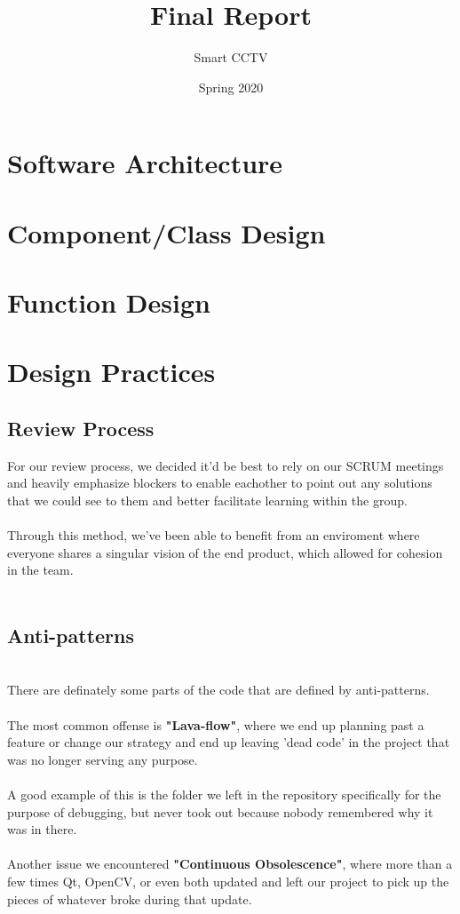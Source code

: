 \documentclass[12pt]{article}
\title{Final Report}
\author{Smart CCTV}
\date{Spring 2020}
\begin{document}
\maketitle
\pagebreak

\section*{Software Architecture}
\pagebreak

\section*{Component/Class Design}

\pagebreak

\section*{Function Design}
\pagebreak

\section*{Design Practices}
\subsection*{Review Process}
For our review process, we decided it'd be best to rely on our SCRUM meetings and heavily emphasize blockers to enable eachother to point out any solutions that we could see to them and better facilitate learning within the group.
\\
\\Through this method, we've been able to benefit from an enviroment where everyone shares a singular vision of the end product, which allowed for cohesion in the team.
\\
\\\subsection*{Anti-patterns}
\\There are definately some parts of the code that are defined by anti-patterns. \\
\\The most common offense is \textbf{"Lava-flow"}, where we end up planning past a feature or change our strategy and end up leaving 'dead code' in the project that was no longer serving any purpose.
\\
\\A good example of this is the folder we left in the repository specifically for the purpose of debugging, but never took out because nobody remembered why it was in there.
\\
\\Another issue we encountered \textbf{"Continuous Obsolescence"}, where more than a few times Qt, OpenCV, or even both updated and left our project to pick up the pieces of whatever broke during that update. 
\pagebreak
\end{document}

